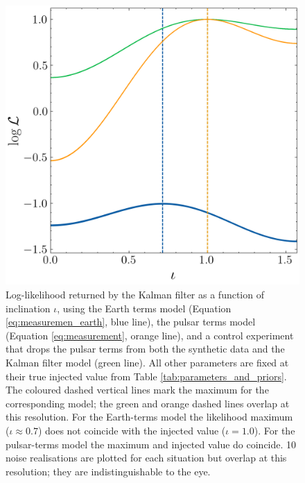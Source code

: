 \documentclass[fleqn,usenatbib,useAMS]{mnras}
\begin{document}
\begin{figure}
	\centering
	\includegraphics[width=\columnwidth]{images/likelihood_iota_new}
	\caption{Log-likelihood returned by the Kalman filter as a function of inclination $\iota$, using the Earth terms model (Equation \ref{eq:measuremen_earth}, blue line), the pulsar terms model (Equation \ref{eq:measurement}, orange line), and a control experiment that drops the pulsar terms from both the synthetic data and the Kalman filter model (green line). All other parameters are fixed at their true injected value from Table \ref{tab:parameters_and_priors}. The coloured dashed vertical lines mark the maximum for the corresponding model; the green and orange dashed lines overlap at this resolution. For the Earth-terms model the likelihood maximum ($\iota \approx 0.7$) does not coincide with the injected value ($\iota = 1.0$). For the pulsar-terms model the maximum and injected value do coincide. 10 noise realisations are plotted for each situation but overlap at this resolution; they are indistinguishable to the eye.}
	\label{fig:likelihood_surface_iota}
\end{figure}
\end{document}
